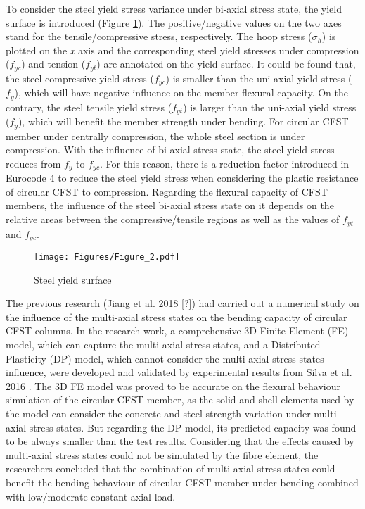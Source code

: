 \documentclass[12pt,a4]{article}
\begin{document}
	To consider the steel yield stress variance under bi-axial stress state, the yield surface is introduced (Figure \ref{fig:2}). The positive/negative values on the two axes stand for the tensile/compressive stress, respectively. The hoop stress ($\sigma_h$) is plotted on the \textit{x} axis and the corresponding steel yield stresses under compression ($f_{yc}$) and tension ($f_{yt}$) are annotated on the yield surface. It could be found that, the steel compressive yield stress ($f_{yc}$) is smaller than the uni-axial yield stress ($f_y$), which will have negative influence on the member flexural capacity. On the contrary, the steel tensile yield stress ($f_{yt}$) is larger than the uni-axial yield stress ($f_y$), which will benefit the member strength under bending. For circular CFST member under centrally compression, the whole steel section is under compression. With the influence of bi-axial stress state, the steel yield stress reduces from $f_y$ to $f_{yc}$. For this reason, there is a reduction factor introduced in Eurocode 4 \cite{RN64} to reduce the steel yield stress when considering the plastic resistance of circular CFST to compression. Regarding the flexural capacity of CFST members, the influence of the steel bi-axial stress state on it depends on the relative areas between the compressive/tensile regions as well as the values of $f_{yt}$ and $f_{yc}$.
	\par
	\begin{figure}[h]
		\centering
		\texttt{[image: Figures/Figure\_2.pdf]}
		\caption{Steel yield surface}
		\label{fig:2}
	\end{figure}
	\par
	The previous research (Jiang et al. 2018 [?]) had carried out a numerical study on the influence of the multi-axial stress states on the bending capacity of circular CFST columns. In the research work, a comprehensive 3D Finite Element (FE) model, which can capture the multi-axial stress states, and a Distributed Plasticity (DP) model, which cannot consider the multi-axial stress states influence, were developed and validated by experimental results from Silva et al. 2016 \cite{Silva2016}. The 3D FE model was proved to be accurate on the flexural behaviour simulation of the circular CFST member, as the solid and shell elements used by the model can consider the concrete and steel strength variation under multi-axial stress states. But regarding the DP model, its predicted capacity was found to be always smaller than the test results. Considering that the effects caused by multi-axial stress states could not be simulated by the fibre element, the researchers concluded that the combination of multi-axial stress states could benefit the bending behaviour of circular CFST member under bending combined with low/moderate constant axial load.
\end{document}
